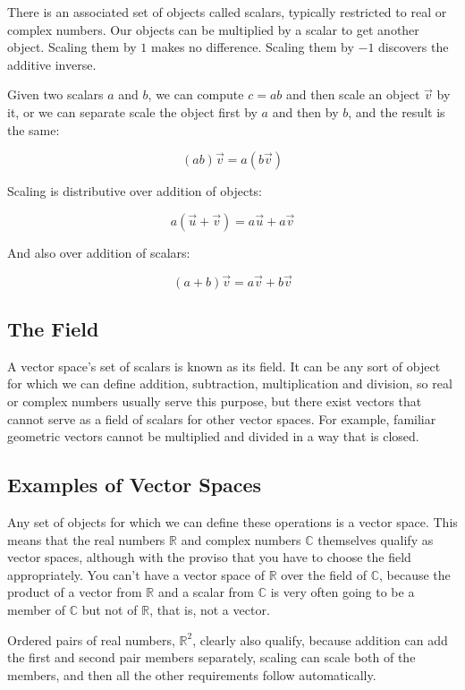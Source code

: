 There is an associated set of objects called scalars, typically restricted to real or complex numbers. Our objects can be multiplied by a scalar to get another object. Scaling them by $1$ makes no difference. Scaling them by $-1$ discovers the additive inverse.

Given two scalars $a$ and $b$, we can compute $c = ab$ and then scale an object $\vec{v}$ by it, or we can separate scale the object first by $a$ and then by $b$, and the result is the same:

$$(ab)\vec{v} = a(b\vec{v})$$

Scaling is distributive over addition of objects:

$$a(\vec{u} + \vec{v}) = a\vec{u} + a\vec{v}$$

And also over addition of scalars:

$$(a + b)\vec{v} = a\vec{v} + b\vec{v}$$

\subsection{The Field}

A vector space's set of scalars is known as its field. It can be any sort of object for which we can define addition, subtraction, multiplication and division, so real or complex numbers usually serve this purpose, but there exist vectors that cannot serve as a field of scalars for other vector spaces. For example, familiar geometric vectors cannot be multiplied and divided in a way that is closed.

\subsection{Examples of Vector Spaces}

Any set of objects for which we can define these operations is a vector space. This means that the real numbers $\mathbb{R}$ and complex numbers $\mathbb{C}$ themselves qualify as vector spaces, although with the proviso that you have to choose the field appropriately. You can't have a vector space of $\mathbb{R}$ over the field of $\mathbb{C}$, because the product of a vector from $\mathbb{R}$ and a scalar from $\mathbb{C}$ is very often going to be a member of $\mathbb{C}$ but not of $\mathbb{R}$, that is, not a vector.

Ordered pairs of real numbers, $\mathbb{R}^2$, clearly also qualify, because addition can add the first and second pair members separately, scaling can scale both of the members, and then all the other requirements follow automatically.

